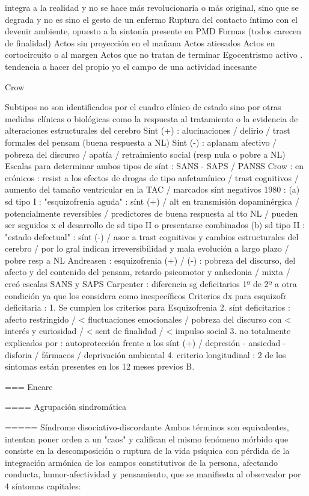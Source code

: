 \documentclass[encares.tex]{subfiles}
\begin{document}
integra a la realidad y no se hace más revolucionaria o más original, sino que se degrada y no es sino el gesto de un enfermo Ruptura del contacto íntimo con el devenir ambiente, opuesto a la sintonía presente en PMD Formas (todos carecen de finalidad) Actos sin proyección en el mañana Actos atiesados Actos en cortocircuito o al margen Actos que no tratan de terminar Egocentrismo activo . tendencia a hacer del propio yo el campo de una actividad incesante

Crow

Subtipos no son identificados por el cuadro clínico de estado sino por otras medidas clínicas o biológicas como la respuesta al tratamiento o la evidencia de alteraciones estructurales del cerebro Sínt (+) : alucinaciones / delirio / trast formales del pensam (buena respuesta a NL) Sínt (-) : aplanam afectivo / pobreza del discurso / apatía / retraimiento social (resp nula o pobre a NL) Escalas para determinar ambos tipos de sínt : SANS - SAPS / PANSS Crow : en crónicos : resist a los efectos de drogas de tipo anfetamínico / trast cognitivos / aumento del tamaño ventricular en la TAC / marcados sínt negativos 1980 : (a) sd tipo I : "esquizofrenia aguda" : sínt (+) / alt en transmisión dopaminérgica / potencialmente reversibles / predictores de buena respuesta al tto NL / pueden ser seguidos x el desarrollo de sd tipo II o presentarse combinados (b) sd tipo II : "estado defectual" : sínt (-) / asoc a trast cognitivos y cambios estructurales del cerebro / por lo gral indican irreversibilidad y mala evolución a largo plazo / pobre resp a NL Andreasen : esquizofrenia (+) / (-) : pobreza del discurso, del afecto y del contenido del pensam, retardo psicomotor y anhedonia / mixta / creó escalas SANS y SAPS Carpenter : diferencia sg deficitarios 1º de 2º a otra condición ya que los considera como inespecíficos Criterios dx para esquizofr deficitaria : 1. Se cumplen los criterios para Esquizofrenia 2. sínt deficitarios : afecto restringido / < fluctuaciones emocionales / pobreza del discurso con < interés y curiosidad / < sent de finalidad / < impulso social 3. no totalmente explicados por : autoprotección frente a los sínt (+) / depresión - ansiedad - disforia / fármacos / deprivación ambiental 4. criterio longitudinal : 2 de los síntomas están presentes en los 12 meses previos B.

=== Encare

==== Agrupación sindromática

===== Síndrome disociativo-discordante
Ambos términos son equivalentes, intentan poner orden a un "caos" y califican el mismo fenómeno mórbido que consiste en la descomposición o ruptura de la vida psíquica con pérdida de la integración armónica de los campos constitutivos de la persona, afectando conducta, humor-afectividad y pensamiento, que se manifiesta al observador por 4 síntomas capitales:
\end{document}
